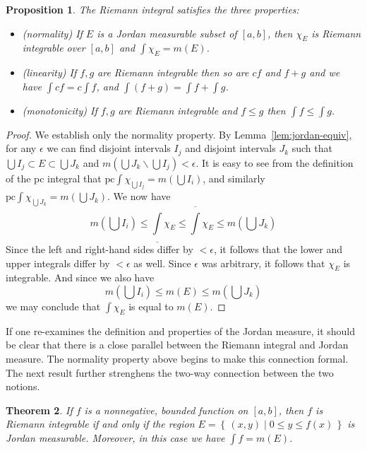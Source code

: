 \documentclass[11pt,oneside]{amsbook}
\newcommand{\set}[1]{\left\{\,#1\,\right\}}
\renewcommand{\setminus}{\smallsetminus}
\newcommand{\lint}{\underline\int}
\newcommand{\ovint}{\overline\int}
\theoremstyle{definition}
\theoremstyle{plain}
\newtheorem{thm}{Theorem}[section]
\newtheorem{prop}[thm]{Proposition}
\theoremstyle{definition}
\theoremstyle{remark}
\numberwithin{equation}{section}
\numberwithin{figure}{section}
\begin{document}

\begin{prop}
  \label{prop:riemann-properties}
  The Riemann integral satisfies the three properties:
  \begin{itemize}
  \item (normality) If $E$ is a Jordan measurable subset of $[a,b]$, then $\chi_E$ is Riemann integrable over $[a,b]$ and $\int\chi_E=m(E)$.
  \item (linearity) If $f,g$ are Riemann integrable then so are $cf$ and $f+g$ and we have $\int cf=c\int f$, and $\int(f+g)=\int f+\int g$.
  \item (monotonicity) If $f,g$ are Riemann integrable and $f\leq g$ then $\int f\leq \int g$.
  \end{itemize}
\end{prop}

\begin{proof}
  We establish only the normality property. By Lemma~\ref{lem:jordan-equiv}, for any $\epsilon$ we can find disjoint intervals $I_j$ and disjoint intervals $J_k$ such that $\bigcup I_j\subset E\subset\bigcup J_k$ and $m(\bigcup J_k\setminus\bigcup I_j)<\epsilon$. It is easy to see from the definition of the pc integral that $\text{pc}\int\chi_{\bigcup I_j}=m(\bigcup I_i)$, and similarly $\text{pc}\int\chi_{\bigcup J_k}=m(\bigcup J_k)$. We now have
  \[m(\bigcup I_i)\leq\lint\chi_E\leq\ovint\chi_E
  \leq m(\bigcup J_k)
  \]
  Since the left and right-hand sides differ by $<\epsilon$, it follows that the lower and upper integrals differ by $<\epsilon$ as well. Since $\epsilon$ was arbitrary, it follows that $\chi_E$ is integrable. And since we also have
  \[m(\bigcup I_i)\leq m(E)\leq m(\bigcup J_k)
  \]
  we may conclude that $\int\chi_E$ is equal to $m(E)$.
\end{proof}

If one re-examines the definition and properties of the Jordan measure, it should be clear that there is a close parallel between the Riemann integral and Jordan measure. The normality property above begins to make this connection formal. The next result further strenghens the two-way connection between the two notions.

\begin{thm}
  If $f$ is a nonnegative, bounded function on $[a,b]$, then $f$ is Riemann integrable if and only if the region $E=\set{(x,y)\mid0\leq y\leq f(x)}$ is Jordan measurable. Moreover, in this case we have $\int f=m(E)$.
\end{thm}
\end{document}
